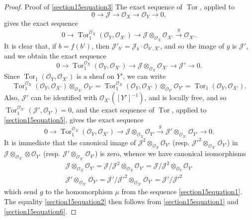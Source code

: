 \documentclass{article}
\theoremstyle{plain}
\theoremstyle{definition}
\newcommand{\sh}{\mathscr}
\DeclareMathOperator{\Tor}{Tor}
\begin{document}
\begin{proof}{Proof of \cref{section15equation3}}
  The exact sequence of $\Tor$, applied to
  \[
    0\to\sh{J}\to\sh{O}_X\to\sh{O}_Y\to0,
  \]
  gives the exact sequence
  \[
    0 \to \Tor_1^{\sh{O}_X}(\sh{O}_Y,\sh{O}_{X'}) \to \sh{J}\otimes_{\sh{O}_X}\sh{O}_{X'} \xrightarrow{g} \sh{O}_{X'}.
  \]
  It is clear that, if $b=f(b')$, then $\sh{J}'_{b'}=\sh{J}_b\cdot\sh{O}_{b',X'}$, and so the image of $g$ is $\sh{J}'$, and we obtain the exact sequence
  \[
  \label{section15equation5}
    0 \to \Tor_1^{\sh{O}_X}(\sh{O}_Y,\sh{O}_{X'}) \to \sh{J}\otimes_{\sh{O}_X}\sh{O}_{X'} \to \sh{J}' \to 0.
    \tag{5}
  \]
  Since $\Tor_1(\sh{O}_Y,\sh{O}_{X'})$ is a sheaf on $Y'$, we can write
  \[
    \Tor_1^{\sh{O}_X}(\sh{O}_Y,\sh{O}_{X'})\otimes_{\sh{O}_{X'}}\sh{O}_{Y'}
    = \Tor_1^{\sh{O}_X}(\sh{O}_Y,\sh{O}_{X'})\otimes_{\sh{O}_{Y'}}\sh{O}_{Y'}
    = \Tor_1(\sh{O}_Y,\sh{O}_{X'}).
  \]
  Also, $\sh{J}'$ can be identified with $\sh{O}_{X'}([Y']^{-1})$, and is locally free, and so $\Tor_1^{\sh{O}_{X'}}(\sh{J}',\sh{O}_{Y'}) = 0$, and the exact sequence of $\Tor$, applied to \cref{section15equation5}, gives the exact sequence
  \[
  \label{section15equation6}
    0 \to \Tor_1^{\sh{O}_X}(\sh{O}_Y,\sh{O}_{X'}) \to \sh{J}\otimes_{\sh{O}_X}\sh{O}_{Y'} \xrightarrow{g} \sh{J}'\otimes_{\sh{O}_{X'}}\sh{O}_{Y'} \to 0.
    \tag{6}
  \]
  It is immediate that the canonical image of $\sh{J}^2\otimes_{\sh{O}_X}\sh{O}_{Y'}$ (resp. $\sh{J}'^2\otimes_{\sh{O}_{X'}}\sh{O}_{Y'}$) in $\sh{J}\otimes_{\sh{O}_X}\otimes\sh{O}_{Y'}$ (resp. $\sh{J}'\otimes_{\sh{O}_{X'}}\sh{O}_{Y'}$) is zero, whence we have canonical isomorphisms
  \begin{gather*}
    \sh{J}\otimes_{\sh{O}_X}\sh{O}_{Y'}
    = \sh{J}/\sh{J}^2\otimes_{\sh{O}_X}\sh{O}_{Y'}
    = \sh{J}/\sh{J}^2\otimes_{\sh{O}_Y}\sh{O}_{Y'}
  \\\sh{J}'\otimes_{\sh{O}_{X'}}\sh{O}_{Y'}
    = \sh{J}'/\sh{J}'^2\otimes_{\sh{O}_{X'}}\sh{O}_{Y'}
    = \sh{J}'/\sh{J}'^2
  \end{gather*}
  which send $g$ to the homomorphism $\mu$ from the sequence \cref{section15equation1}.
  The equality \cref{section15equation2} then follows from \cref{section15equation1} and \cref{section15equation6}.


\end{proof}
\end{document}
